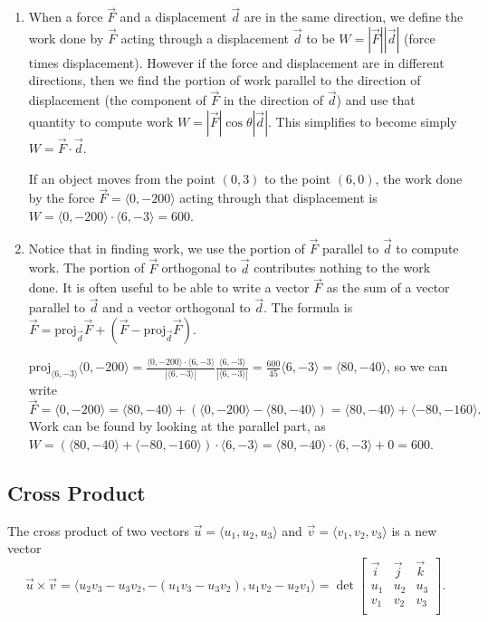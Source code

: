 \begin{enumerate}
\item
When a force $\vec F$ and a displacement $\vec d$ are in the same
direction, we define the work done by $\vec F$ acting through a
displacement $\vec d$ to be $W=|\vec F||\vec d|$ (force times
displacement). However if the force and displacement are in different
directions, then we find the portion of work parallel to the direction
of displacement (the component of $\vec F$ in the direction of $\vec
d$) and use that quantity to compute work $W=|\vec F|\cos\theta |\vec d|$.
This simplifies to become simply $W=\vec F\cdot \vec d$.

If an object moves from the point $(0,3)$ to the point $(6,0)$, the
work done by the force {$\vec F = \langle0,-200\rangle$} acting through
that displacement is $W=\langle0,-200\rangle\cdot \langle6,-3\rangle = 600$.

\item 
Notice that in finding work, we use the portion of $\vec F$ parallel
to $\vec d$ to compute work.  The portion of $\vec F$ orthogonal to
$\vec d$ contributes nothing to the work done. It is often useful to
be able to write a vector $\vec F$ as the sum of a vector parallel to
$\vec d$ and a vector orthogonal to $\vec d$.  The formula is $\vec F
= \text{proj}_{\vec d}\vec F + (\vec F - \text{proj}_{\vec d}\vec F)$.  

\begin{example}
  $\text{proj}_{\langle6,-3\rangle}\langle0,-200\rangle =
  \frac{\langle0,-200\rangle\cdot\langle6,-3\rangle
  }{|\langle6,-3\rangle|}\frac{\langle6,-3\rangle}{|\langle6,-3\rangle|}
  = \frac{600}{45}\langle6,-3\rangle =\langle80,-40\rangle$, so we
  can write $\vec F = \langle0,-200\rangle = \langle80,-40\rangle
  +\left(\langle0,-200\rangle-\langle80,-40\rangle \right) =
  \langle80,-40\rangle + \langle-80,-160\rangle.$ Work can be found by
  looking at the parallel part, as $W=\left(\langle80,-40\rangle +
    \langle-80,-160\rangle\right)\cdot \langle6,-3\rangle =
  \langle80,-40\rangle \cdot \langle6,-3\rangle +0 = 600$.
\end{example}
\end{enumerate}




\subsection{Cross Product}
The cross product of two vectors $\vec u = \langle u_1,u_2,u_3\rangle$
and $\vec v = \langle v_1,v_2,v_3\rangle$ is a new vector $$\vec u\times \vec
v = \langle u_2v_3-u_3v_2,-(u_1v_3-u_3v_2),u_1v_2-u_2v_1\rangle =
\det\begin{bmatrix}\vec i & \vec j&\vec k\\ u_1&u_2&u_3\\
v_1&v_2&v_3\\\end{bmatrix}.$$

